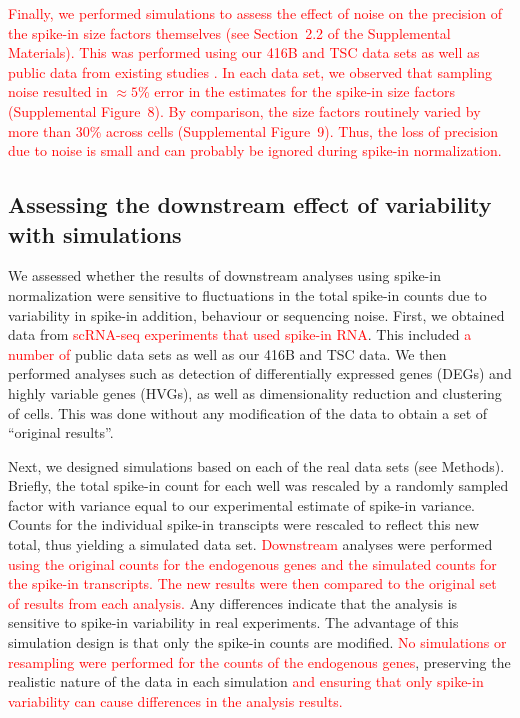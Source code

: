 \documentclass{article}
\newcommand{\suppfignoisier}{8}
\newcommand{\suppfigsizevar}{9}
\newcommand{\suppsecnoisier}{2.2}
\newcommand{\revised}[1]{\textcolor{red}{#1}}
\begin{document}
\revised{Finally, we performed simulations to assess the effect of noise on the precision of the spike-in size factors themselves (see Section~\suppsecnoisier{} of the Supplemental Materials).
    This was performed using our 416B and TSC data sets as well as public data from existing studies \autocite{scialdone2015computational,zeisel2015brain,islam2014quantitative,hashimshony2016celseq2,buettner2015computational,grun2014validation,kolod2015single}.
In each data set, we observed that sampling noise resulted in $\approx 5$\% error in the estimates for the spike-in size factors (Supplemental Figure~\suppfignoisier{}).
By comparison, the size factors routinely varied by more than 30\% across cells (Supplemental Figure~\suppfigsizevar{}).
Thus, the loss of precision due to noise is small and can probably be ignored during spike-in normalization.
}

\subsection*{Assessing the downstream effect of variability with simulations}
We assessed whether the results of downstream analyses using spike-in normalization were sensitive to fluctuations in the total spike-in counts due to variability in spike-in addition, behaviour or sequencing noise.
First, we obtained data from \revised{scRNA-seq experiments that used spike-in RNA}.
This included \revised{a number of} public data sets \autocite{scialdone2015computational,islam2014quantitative,buettner2015computational,grun2014validation,kolod2015single,segerstople2016single} as well as our 416B and TSC data.
We then performed analyses such as detection of differentially expressed genes (DEGs) and highly variable genes (HVGs), as well as dimensionality reduction and clustering of cells.
This was done without any modification of the data to obtain a set of ``original results''.

Next, we designed simulations based on each of the real data sets (see Methods).
Briefly, the total spike-in count for each well was rescaled by a randomly sampled factor with variance equal to our experimental estimate of spike-in variance.
Counts for the individual spike-in transcipts were rescaled to reflect this new total, thus yielding a simulated data set.
\revised{Downstream} analyses were performed \revised{using the original counts for the endogenous genes and the simulated counts for the spike-in transcripts.
The new results were then compared to the original set of results from each analysis.}
Any differences indicate that the analysis is sensitive to spike-in variability in real experiments.
The advantage of this simulation design is that only the spike-in counts are modified.
\revised{No simulations or resampling were performed for the counts of the endogenous genes}, preserving the realistic nature of the data in each simulation \revised{and ensuring that only spike-in variability can cause differences in the analysis results.}
\end{document}
